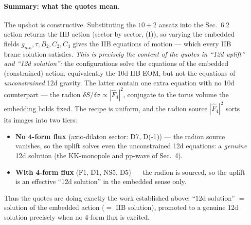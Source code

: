 \paragraph{Summary: what the quotes mean.} The upshot is constructive. Substituting the $10+2$
ansatz into the Sec.~6.2 action returns the IIB action (sector by sector, (I)), so varying the
embedded fields $g_{mn},\tau,B_2,C_2,C_4$ gives the IIB equations of motion --- which every IIB brane
solution satisfies. \emph{This is precisely the content of the quotes in ``12d uplift'' and ``12d
solution'':} the configurations solve the equations of the embedded (constrained) action, equivalently
the 10d IIB EOM, but not the equations of \emph{unconstrained} 12d gravity. The latter contain one
extra equation with no 10d counterpart --- the radion $\delta S/\delta\sigma\propto|\hat F_4|^2$,
conjugate to the torus volume the embedding holds fixed. The recipe is uniform, and the radion source
$|\hat F_4|^2$ sorts its images into two tiers:
\begin{itemize}
\item \textbf{No 4-form flux} (axio-dilaton sector: D7, D(-1)) --- the radion source vanishes, so the
uplift solves even the unconstrained 12d equations: a \emph{genuine} 12d solution (the KK-monopole and
pp-wave of Sec.~4).
\item \textbf{With 4-form flux} (F1, D1, NS5, D5) --- the radion is sourced, so the uplift is an
effective ``12d solution'' in the embedded sense only.
\end{itemize}
Thus the quotes are doing exactly the work established above: ``$12$d solution'' $=$ solution of the
embedded action ($=$ IIB solution), promoted to a genuine 12d solution precisely when no 4-form flux
is excited.

%
%

